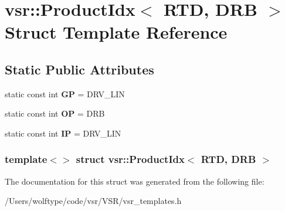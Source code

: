 \hypertarget{structvsr_1_1_product_idx_3_01_r_t_d_00_01_d_r_b_01_4}{\section{vsr\-:\-:Product\-Idx$<$ R\-T\-D, D\-R\-B $>$ Struct Template Reference}
\label{structvsr_1_1_product_idx_3_01_r_t_d_00_01_d_r_b_01_4}
}
\subsection*{Static Public Attributes}
\begin{DoxyCompactItemize}
\item 
\hypertarget{structvsr_1_1_product_idx_3_01_r_t_d_00_01_d_r_b_01_4_ac9be6d58ceebe5d910ad1106c358da03}{static const int {\bfseries G\-P} = D\-R\-V\-\_\-\-L\-I\-N}\label{structvsr_1_1_product_idx_3_01_r_t_d_00_01_d_r_b_01_4_ac9be6d58ceebe5d910ad1106c358da03}

\item 
\hypertarget{structvsr_1_1_product_idx_3_01_r_t_d_00_01_d_r_b_01_4_ac84067439938d0dd377b25081ded1184}{static const int {\bfseries O\-P} = D\-R\-B}\label{structvsr_1_1_product_idx_3_01_r_t_d_00_01_d_r_b_01_4_ac84067439938d0dd377b25081ded1184}

\item 
\hypertarget{structvsr_1_1_product_idx_3_01_r_t_d_00_01_d_r_b_01_4_aa8b482bf87d02ddb3dc62da80b22f099}{static const int {\bfseries I\-P} = D\-R\-V\-\_\-\-L\-I\-N}\label{structvsr_1_1_product_idx_3_01_r_t_d_00_01_d_r_b_01_4_aa8b482bf87d02ddb3dc62da80b22f099}

\end{DoxyCompactItemize}
\subsubsection*{template$<$$>$ struct vsr\-::\-Product\-Idx$<$ R\-T\-D, D\-R\-B $>$}



The documentation for this struct was generated from the following file\-:\begin{DoxyCompactItemize}
\item 
/\-Users/wolftype/code/vsr/\-V\-S\-R/vsr\-\_\-templates.\-h\end{DoxyCompactItemize}
